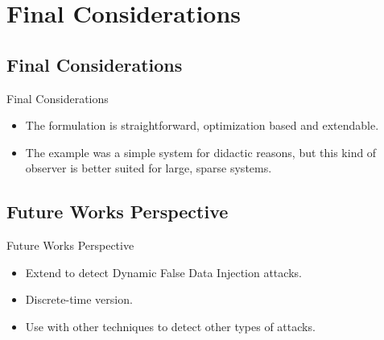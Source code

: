 
\section{Final Considerations}%
\label{sec:conclusion}

\subsection{Final Considerations}%
\label{subsec:conclusion}

\begin{slide}{Final Considerations}
  \begin{itemize}
    \item The formulation is straightforward, optimization based and extendable.
    \item The example was a simple system for didactic reasons, but this kind of
          observer is better suited for large, sparse systems.
  \end{itemize}
\end{slide}

\subsection{Future Works Perspective}%
\label{subsec:future-works}

\begin{slide}{Future Works Perspective}
  \begin{itemize}
    \item Extend to detect Dynamic False Data Injection attacks.
    \item Discrete-time version.
    \item Use with other techniques to detect other types of attacks.
  \end{itemize}
\end{slide}
